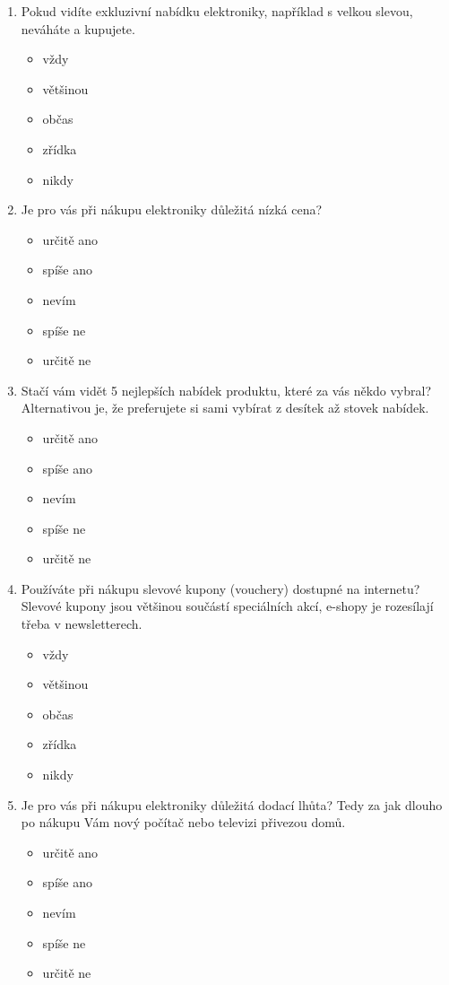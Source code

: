 \documentclass[12pt,twoside,openany]{fithesis}
\begin{document}
\begin{enumerate}
  \item Pokud vidíte exkluzivní nabídku elektroniky, například s velkou slevou, neváháte a kupujete.
    \begin{itemize}
       \item vždy
       \item většinou
       \item občas
       \item zřídka
       \item nikdy
    \end{itemize}

  \item Je pro vás při nákupu elektroniky důležitá nízká cena? 
    \begin{itemize}
       \item určitě ano
       \item spíše ano
       \item nevím
       \item spíše ne
       \item určitě ne
    \end{itemize}

  \item Stačí vám vidět 5 nejlepších nabídek produktu, které za vás někdo vybral?
      Alternativou je, že preferujete si sami vybírat z desítek až stovek nabídek.
    \begin{itemize}
       \item určitě ano
       \item spíše ano
       \item nevím
       \item spíše ne
       \item určitě ne
    \end{itemize}

\item Používáte při nákupu slevové kupony (vouchery) dostupné na internetu?
    Slevové kupony jsou většinou součástí speciálních akcí, e-shopy je rozesílají třeba v newsletterech. 
    \begin{itemize}
       \item vždy
       \item většinou
       \item občas
       \item zřídka
       \item nikdy
    \end{itemize}

  \item Je pro vás při nákupu elektroniky důležitá dodací lhůta?
      Tedy za jak dlouho po nákupu Vám nový počítač nebo televizi přivezou domů.
    \begin{itemize}
       \item určitě ano
       \item spíše ano
       \item nevím
       \item spíše ne
       \item určitě ne
    \end{itemize}


\end{enumerate}
\end{document}
